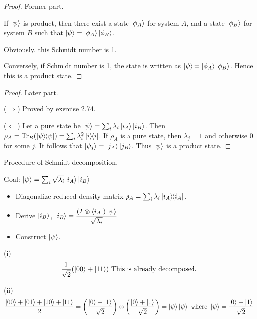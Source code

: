 \begin{proof}
	Former part.

	If $\ket{\psi}$ is product, then there exist a state $\ket{\phi_A}$ for system $A$, and a state $\ket{\phi_B}$ for system $B$ such that
	$\ket{\psi} = \ket{\phi_A} \ket{\phi_B}$.

	Obviously, this Schmidt number is  1.

	Conversely, if Schmidt number is 1, the state is written as $\ket{\psi} = \ket{\phi_A} \ket{\phi_B}$.
	Hence this is a product state.
\end{proof}


\begin{proof}
	Later part.

	($\Rightarrow$) Proved by exercise 2.74.

	($\Leftarrow$) Let a pure state be  $\ket{\psi} = \sum_i \lambda_i \ket{i_A} \ket{i_B}$. Then $\rho_A = \operatorname{Tr}_B (\ket{\psi}\hspace{-1mm} \bra{\psi}) = \sum_i \lambda_i^2 \ket{i}\hspace{-1mm} \bra{i}$.
	If $\rho_A$ is a pure state, then $\lambda_j = 1$ and otherwise 0 for some $j$.
	It follows that  $\ket{\psi_j} = \ket{j_A} \ket{j_B}$. Thus $\ket{\psi}$ is a product state.
\end{proof}


\begin{screen}
	Procedure of Schmidt decomposition.

	Goal: $\ket{\psi} = \sum_{i} \sqrt{\lambda_i} \ket{i_A} \ket{i_B}$

	\begin{itemize}
		\item Diagonalize reduced density matrix $\rho_A = \sum_i \lambda_i \ket{i_A}\hspace{-1mm} \bra{i_A}$.
		\item Derive $\ket{i_B}$, $\displaystyle  \ket{i_B} = \frac{(I \otimes \bra{i_A}) \ket{\psi}}{\sqrt{\lambda_i}}$
		\item Construct $\ket{\psi}$.
	\end{itemize}

\end{screen}


(i)
\begin{align*}
	\frac{1}{\sqrt{2}} (\ket{00} + \ket{11}) \text{ This is already decomposed.}
\end{align*}


(ii)
\begin{align*}
	\frac{\ket{00}+ \ket{01} + \ket{10} + \ket{11}}{2} = \left( \frac{\ket{0} + \ket{1}}{\sqrt{2}}  \right) \otimes \left( \frac{\ket{0} + \ket{1}}{\sqrt{2}}  \right) = \ket{\psi} \ket{\psi} \text{ where } \ket{\psi} = \frac{\ket{0} + \ket{1}}{\sqrt{2}}
\end{align*}



